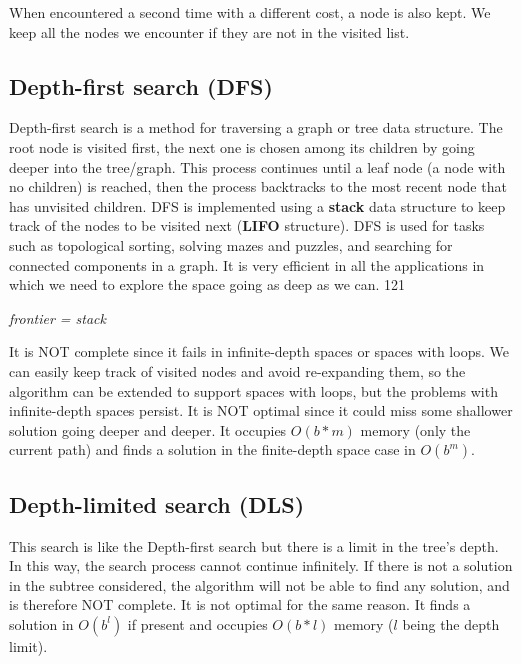 \documentclass{article}
\begin{document}
When encountered a second time with a different cost, a node is also kept. We keep all the nodes we encounter if they are not in the visited list. 

\newpage

\subsection{Depth-first search (DFS)}

Depth-first search is a method for traversing a graph or tree data structure. The root node is visited first, the next one is chosen among its children by going deeper into the tree/graph. This process continues until a leaf node (a node with no children) is reached, then the process backtracks to the most recent node that has unvisited children. DFS is implemented using a \textbf{stack} data structure to keep track of the nodes to be visited next (\textbf{LIFO} structure). DFS is used for tasks such as topological sorting, solving mazes and puzzles, and searching for connected components in a graph. It is very efficient in all the applications in which we need to explore the space going as deep as we can.
121
\begin{center}
    \textit{frontier = stack}
\end{center}

It is NOT complete since it fails in infinite-depth spaces or spaces with loops. We can easily keep track of visited nodes and avoid re-expanding them, so the algorithm can be extended to support spaces with loops, but the problems with infinite-depth spaces persist. It is NOT optimal since it could miss some shallower solution going deeper and deeper. It occupies $O(b * m)$ memory (only the current path) and finds a solution in the finite-depth space case in $O(b^m)$. 

\newpage

\subsection{Depth-limited search (DLS)}

This search is like the Depth-first search but there is a limit in the tree's depth. In this way, the search process cannot continue infinitely. If there is not a solution in the subtree considered, the algorithm will not be able to find any solution, and is therefore NOT complete. It is not optimal for the same reason. It finds a solution in $O(b^l)$ if present and occupies $O(b*l)$ memory ($l$ being the depth limit).
\end{document}
